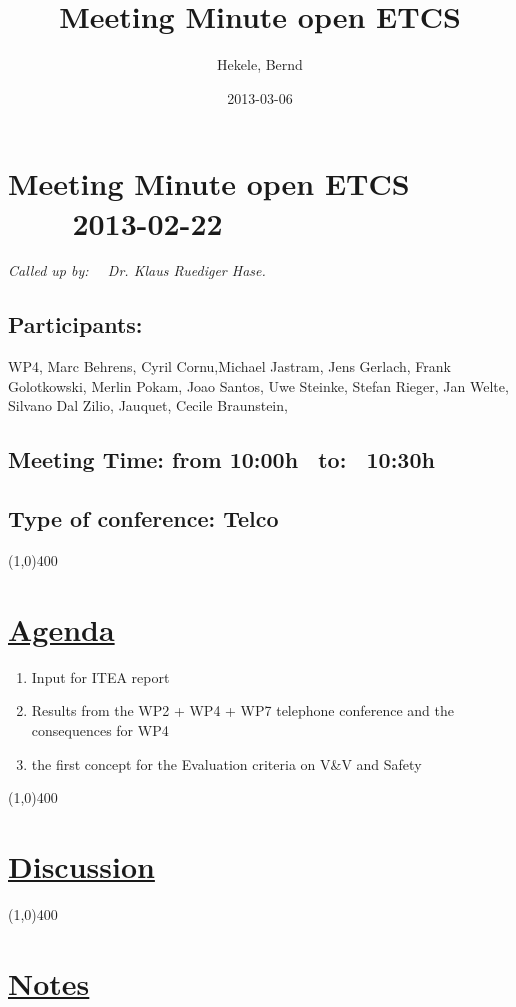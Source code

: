 \documentclass[a4paper]{article}
\title{Meeting Minute open ETCS}
\author{Hekele, Bernd}
\date{2013-03-06}
\begin{document}
\section*{\large{Meeting Minute open ETCS \ \ \ \ 2013-02-22}}

\large{\emph{Called up by: \ \  Dr. Klaus Ruediger Hase.}}

\subsection*{Participants:} WP4, Marc Behrens, Cyril Cornu,Michael Jastram, Jens Gerlach, Frank Golotkowski, Merlin Pokam, Joao Santos, Uwe Steinke, Stefan Rieger, Jan Welte, Silvano Dal Zilio, Jauquet, Cecile Braunstein, \\

\subsection*{Meeting Time: from 10:00h \ to: \ 10:30h}

\subsection*{Type of conference: Telco}

\line(1,0){400}
\section*{\underline{Agenda}}
\begin{enumerate}
\item Input for ITEA report
\item Results from the WP2 + WP4 + WP7 telephone conference and the consequences for WP4
\item the first concept for the Evaluation criteria on V\&V and Safety
\end{enumerate}
\line(1,0){400}
\section*{\underline{Discussion}}



\line(1,0){400}
\section*{\underline{Notes}}
\end{document}
